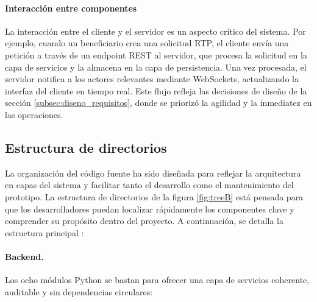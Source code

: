 \paragraph{Interacción entre componentes}

La interacción entre el cliente y el servidor es un aspecto crítico del sistema. Por ejemplo, cuando un beneficiario crea una solicitud RTP, el cliente envía una petición a través de un endpoint REST al servidor, que procesa la solicitud en la capa de servicios y la almacena en la capa de persistencia. Una vez procesada, el servidor notifica a los actores relevantes mediante WebSockets, actualizando la interfaz del cliente en tiempo real. Este flujo refleja las decisiones de diseño de la sección \ref{subsec:diseno_requisitos}, donde se priorizó la agilidad y la inmediatez en las operaciones.


\subsection{Estructura de directorios}
\label{sec:impl-vision-tree}

La organización del código fuente ha sido diseñada para reflejar la arquitectura en capas del sistema y facilitar tanto el desarrollo como el mantenimiento del prototipo. La estructura de directorios de la figura \ref{fig:treeB} está pensada para que los desarrolladores puedan localizar rápidamente los componentes clave y comprender su propósito dentro del proyecto. A continuación, se detalla la estructura principal :

\vspace{.6em}
\paragraph*{Backend.}
Los ocho módulos Python se bastan para ofrecer una capa de servicios
coherente, auditable y sin dependencias circulares:

